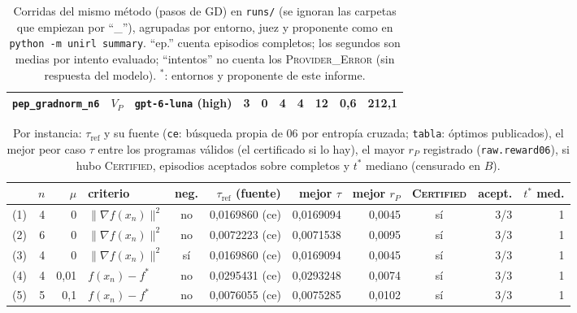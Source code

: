 \documentclass[11pt,a4paper]{article}
\begin{document}
\begin{table}[!ht]
\begin{tabular}{@{}llllrrrrrr@{}}
\texttt{pep\_\allowbreak{}gradnorm\_\allowbreak{}n6} & $V_P$ & \texttt{gpt-\allowbreak{}6-\allowbreak{}luna} (high) & 3 & 0 & 4 & 4 & 12 & 0{,}6 & 212{,}1 \\
\bottomrule
\end{tabular}
\caption{Corridas del mismo método (pasos de GD) en \texttt{runs/} (se ignoran las carpetas que empiezan por ``\_''), agrupadas por entorno, juez y proponente como en \texttt{python -m unirl summary}. ``ep.'' cuenta episodios completos; los segundos son medias por intento evaluado; ``intentos'' no cuenta los \textsc{Provider\_Error} (sin respuesta del modelo). $^\ast$: entornos y proponente de este informe.}
\label{tab:comparacion}
\end{table}

\begin{table}[!ht]
\centering
\scriptsize
\setlength{\tabcolsep}{4pt}
\begin{tabular}{@{}lrrlcrrrcrr@{}}
\toprule
& $n$ & $\mu$ & criterio & neg. & $\tau_{\mathrm{ref}}$ (fuente) & mejor $\tau$ & mejor $r_P$ & \textsc{Certified} & acept. & $t^*$ med. \\
\midrule
(1) & 4 & 0 & $\|\nabla f(x_n)\|^2$ & no & 0{,}0169860 (ce) & 0{,}0169094 & 0{,}0045 & sí & 3/3 & 1 \\
(2) & 6 & 0 & $\|\nabla f(x_n)\|^2$ & no & 0{,}0072223 (ce) & 0{,}0071538 & 0{,}0095 & sí & 3/3 & 1 \\
(3) & 4 & 0 & $\|\nabla f(x_n)\|^2$ & sí & 0{,}0169860 (ce) & 0{,}0169094 & 0{,}0045 & sí & 3/3 & 1 \\
(4) & 4 & 0{,}01 & $f(x_n) - f^*$ & no & 0{,}0295431 (ce) & 0{,}0293248 & 0{,}0074 & sí & 3/3 & 1 \\
(5) & 5 & 0{,}1 & $f(x_n) - f^*$ & no & 0{,}0076055 (ce) & 0{,}0075285 & 0{,}0102 & sí & 3/3 & 1 \\
\bottomrule
\end{tabular}
\caption{Por instancia: $\tau_{\mathrm{ref}}$ y su fuente (\texttt{ce}: búsqueda propia de 06 por entropía cruzada; \texttt{tabla}: óptimos publicados), el mejor peor caso $\tau$ entre los programas válidos (el certificado si lo hay), el mayor $r_P$ registrado (\texttt{raw.reward06}), si hubo \textsc{Certified}, episodios aceptados sobre completos y $t^*$ mediano (censurado en $B$).}
\label{tab:instancias}
\end{table}
\end{document}
